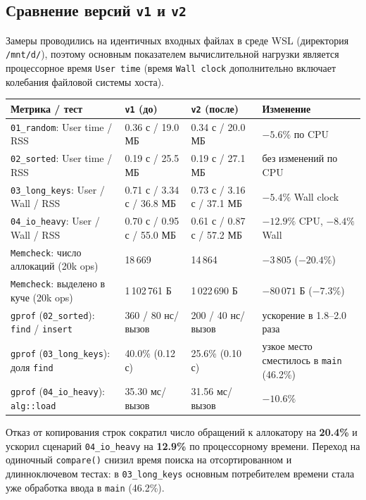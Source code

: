 \subsection{Сравнение версий \texttt{v1} и \texttt{v2}}
Замеры проводились на идентичных входных файлах в среде WSL (директория \texttt{/mnt/d/}), поэтому основным показателем вычислительной нагрузки является процессорное время \texttt{User time} (время \texttt{Wall clock} дополнительно включает колебания файловой системы хоста).

\begin{longtable}{|p{4.6cm}|p{2.9cm}|p{2.9cm}|p{3.8cm}|}
\hline
\rowcolor{lightgray}
\textbf{Метрика / тест} & \textbf{\texttt{v1} (до)} & \textbf{\texttt{v2} (после)} & \textbf{Изменение} \\
\hline
\texttt{01\_random}: User time / RSS & 0.36 с / 19.0 МБ & 0.34 с / 20.0 МБ & $-5.6\%$ по CPU \\
\hline
\texttt{02\_sorted}: User time / RSS & 0.19 с / 25.5 МБ & 0.19 с / 27.1 МБ & без изменений по CPU \\
\hline
\texttt{03\_long\_keys}: User / Wall / RSS & 0.71 с / 3.34 с / 36.8 МБ & 0.73 с / 3.16 с / 37.1 МБ & $-5.4\%$ Wall clock \\
\hline
\texttt{04\_io\_heavy}: User / Wall / RSS & 0.70 с / 0.95 с / 55.0 МБ & 0.61 с / 0.87 с / 57.2 МБ & $-12.9\%$ CPU, $-8.4\%$ Wall \\
\hline
\texttt{Memcheck}: число аллокаций (20k ops) & 18\,669 & 14\,864 & $-3\,805$ ($-20.4\%$) \\
\hline
\texttt{Memcheck}: выделено в куче (20k ops) & 1\,102\,761 Б & 1\,022\,690 Б & $-80\,071$ Б ($-7.3\%$) \\
\hline
\texttt{gprof} (\texttt{02\_sorted}): \texttt{find} / \texttt{insert} & 360 / 80 нс/вызов & 200 / 40 нс/вызов & ускорение в 1.8--2.0 раза \\
\hline
\texttt{gprof} (\texttt{03\_long\_keys}): доля \texttt{find} & 40.0\% (0.12 с) & 25.6\% (0.10 с) & узкое место сместилось в \texttt{main} (46.2\%) \\
\hline
\texttt{gprof} (\texttt{04\_io\_heavy}): \texttt{alg::load} & 35.30 мс/вызов & 31.56 мс/вызов & $-10.6\%$ \\
\hline
\end{longtable}

Отказ от копирования строк сократил число обращений к аллокатору на \textbf{20.4\%} и ускорил сценарий \texttt{04\_io\_heavy} на \textbf{12.9\%} по процессорному времени. Переход на одиночный \texttt{compare()} снизил время поиска на отсортированном и длинноключевом тестах: в \texttt{03\_long\_keys} основным потребителем времени стала уже обработка ввода в \texttt{main} (46.2\%).

\pagebreak
